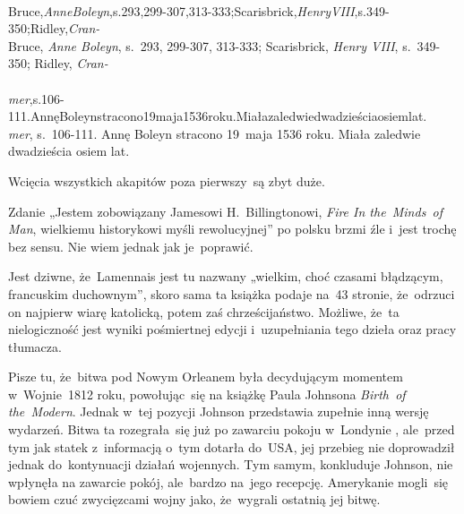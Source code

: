 \documentclass[a4paper,11pt]{article}
\begin{document}
\noindent
{} \\
\Jest Bruce,\emph{AnneBoleyn},s.293,299-307,313-333;Scarisbrick,\emph{HenryVIII},s.349-350;Ridley,\emph{Cran-} \\
\Powin Bruce, \emph{Anne Boleyn}, s.~293, 299-307, 313-333; Scarisbrick, \emph{Henry VIII}, s.~349-350; Ridley, \emph{Cran-} \\
 \\
\Jest
\emph{mer},s.106-111.AnnęBoleynstracono19maja1536roku.Miałazaledwiedwadzieściaosiemlat. \\
\Powin \emph{mer}, s.~106-111. Annę Boleyn stracono 19~maja 1536 roku.
Miała zaledwie dwadzieścia osiem lat. \\

\vspace{\spaceTwo}













\start {} Wcięcia wszystkich akapitów poza pierwszy~są zbyt
duże.

\vspace{\spaceFour}


\start {} Zdanie „Jestem zobowiązany Jamesowi
H.~Billingtonowi, \emph{Fire In the~Minds~of Man}, wielkiemu
historykowi myśli rewolucyjnej” po polsku brzmi źle i~jest trochę bez
sensu. Nie wiem jednak jak je~poprawić.

\vspace{\spaceFour}


\start {} Jest dziwne, że~Lamennais jest tu nazwany „wielkim,
choć czasami błądzącym, francuskim duchownym”, skoro sama ta książka
podaje na~43 stronie, że~odrzuci on najpierw wiarę katolicką, potem
zaś chrześcijaństwo. Możliwe, że~ta nielogiczność jest wyniki
pośmiertnej edycji i~uzupełniania tego dzieła oraz pracy tłumacza.

\vspace{\spaceFour}


\start {} Pisze tu, że~bitwa pod Nowym Orleanem była decydującym
momentem w~Wojnie~1812 roku, powołując~się na książkę Paula Johnsona
\emph{Birth~of the~Modern}. Jednak w~tej pozycji Johnson przedstawia
zupełnie inną wersję wydarzeń. Bitwa ta rozegrała~się już po zawarciu
pokoju w~Londynie , ale~przed tym jak statek
z~informacją o~tym dotarła do~USA, jej przebieg nie doprowadził jednak
do~kontynuacji działań wojennych. Tym samym, konkluduje Johnson, nie
wpłynęła na zawarcie pokój, ale~bardzo na~jego recepcję. Amerykanie
mogli~się bowiem czuć zwycięzcami wojny jako, że~wygrali ostatnią jej
bitwę.
\end{document}
